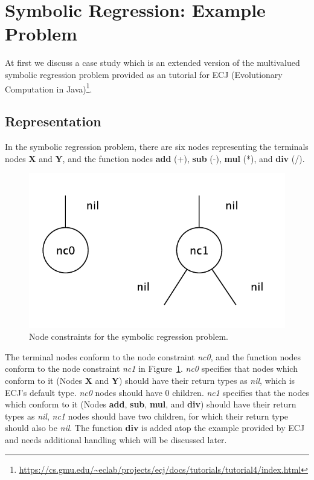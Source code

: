 \section{Symbolic Regression: Example Problem}
At first we discuss a case study which is an extended version of the multivalued symbolic regression problem provided as an tutorial for ECJ (Evolutionary Computation in Java)\footnote{\url{https://cs.gmu.edu/~eclab/projects/ecj/docs/tutorials/tutorial4/index.html}}. 

\subsection{Representation}
In the symbolic regression problem, there are six nodes representing the terminals nodes \textbf{X} and \textbf{Y}, and the function nodes \textbf{add} (+), \textbf{sub} (-), \textbf{mul} (*), and \textbf{div} (/). 
\begin{figure}
	\centering
	\includegraphics[width=0.5\linewidth]{./fig/symbolic_example_ncs}
	\caption{Node constraints for the symbolic regression problem.}
	\label{fig:symb_ncs}
\end{figure}

The terminal nodes conform to the node constraint \emph{nc0}, and the function nodes conform to the node constraint \emph{nc1} in Figure~\ref{fig:symb_ncs}. \emph{nc0} specifies that nodes which conform to it (Nodes \textbf{X} and \textbf{Y}) should have their return types as \emph{nil}, which is ECJ's default type. \emph{nc0} nodes should have 0 children. \emph{nc1} specifies that the nodes which conform to it (Nodes \textbf{add}, \textbf{sub}, \textbf{mul}, and \textbf{div}) should have their return types as \emph{nil}, \emph{nc1} nodes should have two children, for which their return type should also be \emph{nil}. The function \textbf{div} is added atop the example provided by ECJ and needs additional handling which will be discussed later. 

